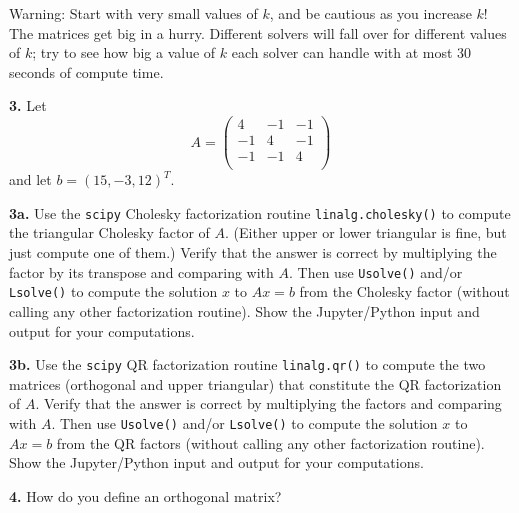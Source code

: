 \documentclass[11pt]{article}
\begin{document}
Warning: Start with very small values of $k$, and be cautious
as you increase $k$!
The matrices get big in a hurry.
Different solvers will fall over for different values of $k$;
try to see how big a value of $k$ each solver can handle with
at most 30 seconds of compute time.

\par\newpage
{\bf 3.} 
Let
$$A =
   \left(
   \begin{array}{ccc}
    4 & -1 & -1 \\ 	
   -1 &  4 & -1 \\ 
   -1 & -1 &  4 \\
   \end{array} \right)
$$
and let $b = (15, -3, 12)^T$.

\par\medskip
{\bf 3a.}
Use the {\tt scipy} Cholesky factorization routine {\tt linalg.cholesky()}
to compute the triangular Cholesky factor of $A$.
(Either upper or lower triangular is fine, but just compute one of them.)
Verify that the answer is correct by multiplying the factor by its transpose and
comparing with $A$.
Then use {\tt Usolve()} and/or {\tt Lsolve()} to compute the solution $x$
to $Ax=b$ from the Cholesky factor (without calling any other factorization routine).
Show the Jupyter/Python input and output for your computations.

\par\medskip
{\bf 3b.}
Use the {\tt scipy} QR factorization routine {\tt linalg.qr()}
to compute the two matrices (orthogonal and upper triangular) that
constitute the QR factorization of $A$.
Verify that the answer is correct by multiplying the factors and comparing with $A$.
Then use {\tt Usolve()} and/or {\tt Lsolve()} to compute the solution $x$
to $Ax=b$ from the QR factors (without calling any other factorization routine).
Show the Jupyter/Python input and output for your computations.

\par\bigskip
{\bf 4.}
How do you define an orthogonal matrix? 
\end{document}
